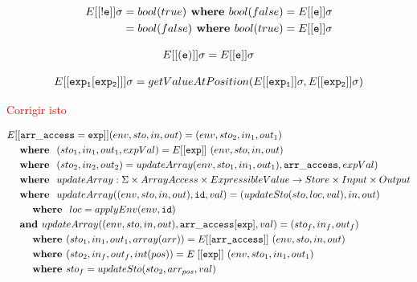\documentclass[12pt]{article}
\newcommand{\red}{\textcolor{red}}
\newcommand\eb[1]{[[\texttt{#1}]]}
\begin{document}
\begin{align*}
E[[{\tt !e}]] \sigma = bool(true) \textbf{ where } bool(false) = E[[{\tt e}]] \sigma \\
                     = bool(false) \textbf{ where }
bool(true) = E[[{\tt e}]] \sigma \\
\end{align*}

$$E[[{\tt (e)}]] \sigma = E[[{\tt e}]] \sigma$$

\begin{align*}
E[[{\tt exp_1 [ exp_2 ]}]] \sigma = getValueAtPosition(E[[{\tt exp_1}]] \sigma, E[[{\tt exp_2}]] \sigma)
\end{align*}

\red{\Large Corrigir isto}

\begin{align*}
&E[[{\tt arr\_access = exp}]] (env,sto,in,out) = (env,sto_2,in_1,out_1) \\
&\hspace{3ex}\textbf{where }\ (sto_1,in_1,out_1,expVal) = E\eb{exp}\ (env, sto, in, out) \\
&\hspace{3ex}\textbf{where }\ (sto_2,in_2,out_2) = updateArray(env,sto_1,in_1,out_1),{\tt arr\_access}, expVal) \\
&\hspace{3ex}\textbf{where }\ updateArray : \Sigma \times ArrayAccess \times ExpressibleValue \to Store \times Input \times Output \\
&\hspace{3ex}\textbf{where }\ updateArray( (env,sto,in,out), {\tt id}, val) = (updateSto(sto,loc,val), in, out)\\
&\hspace{6ex}\textbf{where }\ loc = applyEnv(env,{\tt id})\\
&\hspace{3ex}\textbf{and } updateArray((env,sto,in,out), {\tt arr\_access[exp]}, val) = (sto_f,in_f,out_f)\\
&\hspace{6ex}\textbf{where } (sto_1, in_1, out_1, array(arr)) = E\eb{arr\_access}\ (env, sto, in, out) \\
&\hspace{6ex}\textbf{where } (sto_2, in_f, out_f, int(pos)) = E\;\eb{exp}\ (env, sto_1, in_1, out_1) \\
&\hspace{6ex}\textbf{where } sto_f = updateSto(sto_2, arr_{pos}, val) \\
\end{align*}
\end{document}
